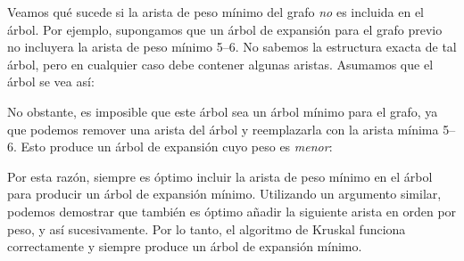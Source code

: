 Veamos qué sucede si la arista de peso mínimo del grafo \emph{no} es
incluida en el árbol. Por ejemplo, supongamos que un árbol de expansión
para el grafo previo no incluyera la arista de peso mínimo 5--6.
No sabemos la estructura exacta de tal árbol, pero en cualquier caso
debe contener algunas aristas. Asumamos que el árbol se vea así:
\begin{center}
\end{center}

No obstante, es imposible que este árbol sea un árbol mínimo para
el grafo, ya que podemos remover una arista del árbol y
reemplazarla con la arista mínima 5--6. Esto produce un árbol
de expansión cuyo peso es \emph{menor}:

\begin{center}
\end{center}

Por esta razón, siempre es óptimo incluir la arista de peso mínimo
en el árbol para producir un árbol de expansión mínimo. Utilizando
un argumento similar, podemos demostrar que también es óptimo añadir
la siguiente arista en orden por peso, y así sucesivamente.
Por lo tanto, el algoritmo de Kruskal funciona correctamente y
siempre produce un árbol de expansión mínimo.

